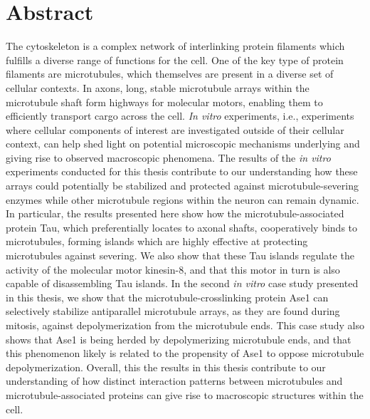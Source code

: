 \chapter*{Abstract}
The cytoskeleton is a complex network of interlinking protein filaments which fulfills a diverse range of functions for the cell. One of the key type of protein filaments are microtubules, which themselves are present in a diverse set of cellular contexts. In axons, long, stable microtubule arrays within the microtubule shaft form highways for molecular motors, enabling them to efficiently transport cargo across the cell. \textit{In vitro} experiments, i.e., experiments where cellular components of interest are investigated outside of their cellular context, can help shed light on potential microscopic mechanisms underlying and giving rise to observed macroscopic phenomena. The results of the \textit{in vitro} experiments conducted for this thesis contribute to our understanding how these arrays could potentially be stabilized and protected against microtubule-severing enzymes while other microtubule regions within the neuron can remain dynamic. In particular, the results presented here show how the microtubule-associated protein Tau, which preferentially locates to axonal shafts, cooperatively binds to microtubules, forming islands which are highly effective at protecting microtubules against severing. We also show that these Tau islands regulate the activity of the molecular motor kinesin-8, and that this motor in turn is also capable of disassembling Tau islands. In the second \textit{in vitro} case study presented in this thesis, we show that the microtubule-crosslinking protein Ase1 can selectively stabilize antiparallel microtubule arrays, as they are found during mitosis, against depolymerization from the microtubule ends. This case study also shows that Ase1 is being herded by depolymerizing microtubule ends, and that this phenomenon likely is related to the propensity of Ase1 to oppose microtubule depolymerization. Overall, this the results in this thesis contribute to our understanding of how distinct interaction patterns between microtubules and microtubule-associated proteins can give rise to macroscopic structures within the cell.


